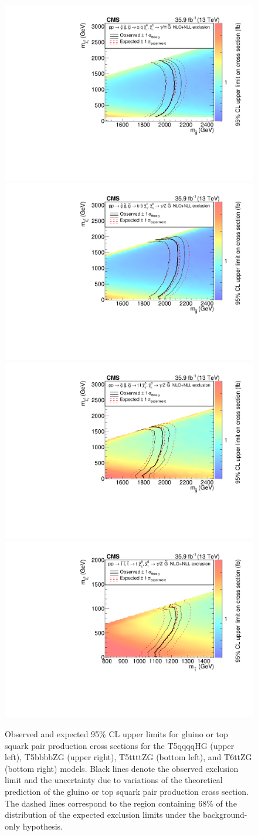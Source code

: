 \begin{figure}[htb!]
\centering
\includegraphics[width=0.48\linewidth]{../Figures/Chap4/Figure_005-a.pdf}
\includegraphics[width=0.48\linewidth]{../Figures/Chap4/Figure_005-b.pdf}\\
\includegraphics[width=0.48\linewidth]{../Figures/Chap4/Figure_005-c.pdf}
\includegraphics[width=0.48\linewidth]{../Figures/Chap4/Figure_005-d.pdf}
\captionsetup{width=.95\linewidth}
\caption{Observed and expected 95\% CL upper limits for gluino or top squark pair production cross sections
for the T5qqqqHG (upper left), T5bbbbZG (upper right), T5ttttZG (bottom left), and T6ttZG
(bottom right) models. Black lines denote the
observed exclusion limit and the uncertainty due to variations of the
theoretical prediction of the gluino or top squark pair production cross section.
The dashed lines correspond to the region containing 68\% of the distribution of
the expected exclusion limits under the background-only hypothesis.}
\label{fig:exclusions}
\end{figure}

